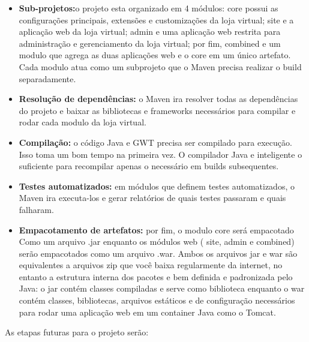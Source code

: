 \begin{itemize}

\item \textbf{Sub-projetos:}o projeto esta organizado em 4 módulos: core possui
as configurações principais, extensões e customizações da loja virtual;
site e a aplicação web da loja virtual; admin e uma aplicação web
restrita para administração e gerenciamento da loja virtual; por fim,
combined e um modulo que agrega as duas aplicações web e o core
em um único artefato. Cada modulo atua como um subprojeto que o
Maven precisa realizar o build separadamente.

\item \textbf{Resolução de dependências:}  o Maven ira resolver todas as dependências
do projeto e baixar as bibliotecas e frameworks necessários para
compilar e rodar cada modulo da loja virtual.

\item \textbf {Compilação:} o código Java e GWT precisa ser compilado para execução.
Isso toma um bom tempo na primeira vez. O compilador Java e
inteligente o suficiente para recompilar apenas o necessário em builds
subsequentes.

\item \textbf {Testes automatizados:} em módulos que definem testes automatizados,
o Maven ira executa-los e gerar relatórios de quais testes passaram e
quais falharam.

\item \textbf {Empacotamento de artefatos:} por fim, o modulo core será empacotado
Como um arquivo .jar enquanto os módulos web ( site, admin
e combined) serão empacotados como um arquivo .war. Ambos os
arquivos jar e war são equivalentes a arquivos zip que você baixa
regularmente da internet, no entanto a estrutura interna dos pacotes e
bem definida e padronizada pelo Java: o jar contém classes compiladas
e serve como biblioteca enquanto o war contém classes, bibliotecas,
arquivos estáticos e de configuração necessários para rodar uma
aplicação web em um container Java como o Tomcat.

\end{itemize}


As etapas futuras para o projeto serão:

